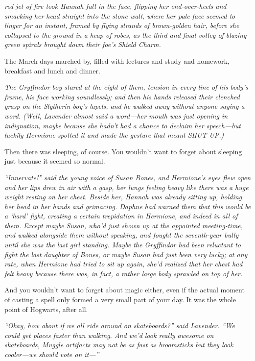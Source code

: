 
 \emph{red jet
of fire took Hannah full in the face, flipping her end-over-heels and smacking
her head straight into the stone wall, where her pale face seemed to linger for
an instant, framed by flying strands of brown-golden hair, before she collapsed
to the ground in a heap of robes, as the third and final volley of blazing
green spirals brought down their foe's Shield Charm.}

The March days marched by, filled with lectures and study and homework,
breakfast and lunch and dinner.

\emph{The Gryffindor boy stared at the eight of them, tension in every line of
his body's frame, his face working soundlessly; and then his hands released
their clenched grasp on the Slytherin boy's lapels, and he walked away without
anyone saying a word. (Well, Lavender almost said a word---her mouth was just
opening in indignation, maybe because she hadn't had a chance to declaim her
speech---but luckily Hermione spotted it and made the gesture that meant SHUT
UP.)}

Then there was sleeping, of course. You wouldn't want to forget about sleeping
just because it seemed so normal.

\emph{``Innervate!'' said the young voice of Susan Bones, and Hermione's eyes
flew open and her lips drew in air with a gasp, her lungs feeling heavy like
there was a huge weight resting on her chest. Beside her, Hannah was already
sitting up, holding her head in her hands and grimacing. Daphne had warned them
that this would be a `hard' fight, creating a certain trepidation in Hermione,
and indeed in all of them. Except maybe Susan, who'd just shown up at the
appointed meeting-time, and walked alongside them without speaking, and fought
the seventh-year bully until she was the last girl standing. Maybe the
Gryffindor had been reluctant to fight the last daughter of Bones, or maybe
Susan had just been very lucky; at any rate, when Hermione had tried to sit
up again, she'd realized that her chest had felt heavy because there was, in
fact, a rather large body sprawled on top of her.}

And you wouldn't want to forget about magic either, even if the actual moment
of casting a spell only formed a very small part of your day. It was the whole
point of Hogwarts, after all.

\emph{``Okay, how about if we all ride around on skateboards?'' said Lavender.
``We could get places faster than walking. And we'd look really awesome on
skateboards, Muggle artifacts may not be as fast as broomsticks but they look
cooler---we should vote on it---''}


